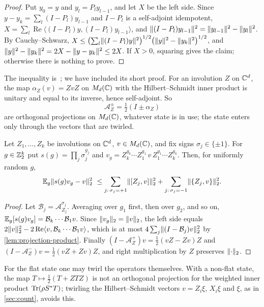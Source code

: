 \begin{proof}
Put $y_0=y$ and $y_l=P_ly_{l-1}$, and let $X$ be the left side. Since $y-y_k=\sum_l(I-P_l)y_{l-1}$ and $I-P_l$ is a self-adjoint idempotent,
$X=\sum_l\operatorname{Re}\langle(I-P_l)y,(I-P_l)y_{l-1}\rangle$, and $\lVert (I-P_l)y_{l-1}\rVert^2=\lVert y_{l-1}\rVert^2-\lVert y_l\rVert^2$. By
Cauchy--Schwarz, $X\le\bigl(\sum_l\lVert (I-P_l)y\rVert^2\bigr)^{1/2}\bigl(\lVert y\rVert^2-\lVert y_k\rVert^2\bigr)^{1/2}$, and
$\lVert y\rVert^2-\lVert y_k\rVert^2=2X-\lVert y-y_k\rVert^2\le2X$. If $X>0$, squaring gives the claim; otherwise there is nothing to prove.
\end{proof}

The inequality is~\cite[Lemma~4.1]{DM-H3}; we have included its short proof. For an involution $Z$ on $\mathbb C^d$, the map
$\alpha_Z(v)=ZvZ$ on $M_d(\mathbb C)$ with the Hilbert--Schmidt inner product is unitary and equal to its inverse, hence self-adjoint. So
\[
\mathcal A^{\pm}_Z=\tfrac12(I\pm\alpha_Z)
\]
are orthogonal projections on $M_d(\mathbb C)$, whatever state is in use; the state enters only through the vectors that are twirled.

\begin{lemma}\label{lem:twirl}
Let $Z_1,\dots,Z_k$ be involutions on $\mathbb C^d$, $v\in M_d(\mathbb C)$, and fix signs $\sigma_j\in\{\pm1\}$. For $g\in\mathbb Z_2^k$ put
$s(g)=\prod_j\sigma_j^{g_j}$ and $v_g=Z_k^{g_k}\cdots Z_1^{g_1}\,v\,Z_1^{g_1}\cdots Z_k^{g_k}$. Then, for uniformly random $g$,
\[
\E_g\hs{s(g)v_g-v}^2\ \le\sum_{j:\,\sigma_j=+1}\hs{[Z_j,v]}^2+\sum_{j:\,\sigma_j=-1}\hs{\{Z_j,v\}}^2 .
\]
\end{lemma}

\begin{proof}
Let $\mathcal B_j=\mathcal A^{\sigma_j}_{Z_j}$. Averaging over $g_1$ first, then over $g_2$, and so on,
$\mathbb E_g[s(g)v_g]=\mathcal B_k\cdots\mathcal B_1v$. Since $\lVert v_g\rVert_2=\lVert v\rVert_2$, the left side equals
$2\lVert v\rVert_2^2-2\operatorname{Re}\langle v,\mathcal B_k\cdots\mathcal B_1v\rangle$, which is at most $4\sum_j\lVert (I-\mathcal B_j)v\rVert_2^2$ by
\cref{lem:projection-product}. Finally $(I-\mathcal A^+_Z)v=\frac12(vZ-Zv)Z$ and $(I-\mathcal A^-_Z)v=\frac12(vZ+Zv)Z$, and right
multiplication by $Z$ preserves $\lVert \cdot\rVert_2$.
\end{proof}

For the flat state one may twirl the operators themselves. With a non-flat state, the map $T\mapsto\frac12(T+ZTZ)$ is not an orthogonal
projection for the weighted inner product $\operatorname{Tr}(\rho S^*T)$; twirling the Hilbert--Schmidt vectors $v=Z_i\xi$, $X_i\xi$ and $\xi$, as in
\cref{sec:count}, avoids this.


